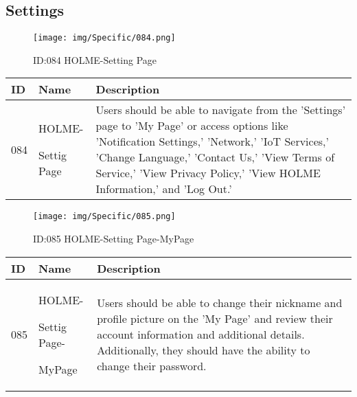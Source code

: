 \documentclass[conference]{IEEEtran}
\begin{document}
\begin{enumerate}
\subsection{Settings}
\begin{figure}[h]
\centering                                         
\texttt{[image: img/Specific/084.png]}
\caption{ID:084 HOLME-Setting Page}
\end{figure}
\begin{table}[h]
\def\arraystretch{1.2} \small
    \begin{tabular}{|p{1cm}|p{1.8cm}|p{5.0cm}|}
        \hline
        ID & Name & Description\\ \hline
         084 \par  & HOLME-\par Settig Page & 
         Users should be able to navigate from the 'Settings' page to 'My Page' or access options like 'Notification Settings,' 'Network,' 'IoT Services,' 'Change Language,' 'Contact Us,' 'View Terms of Service,' 'View Privacy Policy,' 'View HOLME Information,' and 'Log Out.'
         \\ \hline
    \end{tabular}
\end{table}
\begin{figure}[h]
\centering                                         
\texttt{[image: img/Specific/085.png]}
\caption{ID:085 HOLME-Setting Page-MyPage}
\end{figure}
\begin{table}[h]
\def\arraystretch{1.2} \small
    \begin{tabular}{|p{1cm}|p{1.8cm}|p{5.0cm}|}
        \hline
        ID & Name & Description\\ \hline
         085 \par  & HOLME-\par Settig Page- \par MyPage & 
        Users should be able to change their nickname and profile picture on the 'My Page' and review their account information and additional details. Additionally, they should have the ability to change their password.
         \\ \hline
    \end{tabular}
\end{table}
\clearpage


\end{enumerate}
\end{document}
